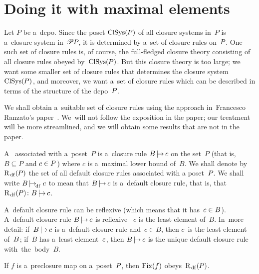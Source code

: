 \documentclass[11pt,letterpaper]{article}
\renewcommand{\thmskip}{\bigskip}
\begin{document}
\section{Doing it with maximal elements}
\label{sec:do-it-with-max-elems}

Let $P$ be a~dcpo.
Since the poset $\mathop{\smash{\mathrm{ClSys}}}\nolimits(\mspace{-1mu} P)$ of all closure systems in~$P$
	is a~closure system in $\mathscr{P}\mspace{-1mu} P\mspace{-1mu}$,
it is determined by a~set of closure rules on~$P\mspace{-1mu}$.
One such set of closure rules is, of course, the full-fledged closure theory
consisting of all closure rules obeyed by~$\mathop{\smash{\mathrm{ClSys}}}\nolimits(\mspace{-1mu} P)\mspace{1mu}$.
But this closure theory is too large;
we want some smaller set of closure rules
	that determines the closure system $\mathop{\smash{\mathrm{ClSys}}}\nolimits(\mspace{-1mu} P)\mspace{1mu}$,
and moreover,
we want a~set of closure rules
	which can be described in terms of the structure of the dcpo~$P\mspace{-1mu}$.

We shall obtain a~suitable set of closure rules using the approach
	in~Francesco Ranzato's paper~\cite{ranzato}.
We~will not follow the exposition in the paper;
our treatment will be more streamlined,	and we will obtain some results that are not in the paper.

\txtskip

A~ associated with a~poset~$P$ %
is a~closure rule $B\mspace{-2mu}\mathrel{{{|}\mspace{-3.5mu}{\rightarrow}}_{\!}}c$ on the set~$P$
	(that is, $B\subseteq P$ and $c\in P\mspace{1mu}$)
where $c$ is a~maximal lower bound of~$B$.
We shall denote by $\mathrm{R}_{\mspace{2mu}\mathrm{df}}(\mspace{-1mu} P)$
	the set of all default closure rules associated with a poset~$P\mspace{-1mu}$.
We shall write $B\mspace{-2mu}\mathrel{{{|}\mspace{-3.5mu}{\rightarrow}}_{\!\mathrm{df}}}c$
	to mean that $B\mspace{-2mu}\mathrel{{{|}\mspace{-3.5mu}{\rightarrow}}_{\!}}c$ is a~default closure rule,
that is, that $\mathrm{R}_{\mspace{2mu}\mathrm{df}}(\mspace{-1mu} P)\colon B\mspace{-2mu}\mathrel{{{|}\mspace{-3.5mu}{\rightarrow}}_{\!}}c\mspace{1mu}$.

\txtskip

A~default closure rule can be reflexive (which means that it has~$c\in B\mspace{1mu}$).
A~default closure rule $B\mspace{-2mu}\mathrel{{{|}\mspace{-3.5mu}{\rightarrow}}_{\!}}c$ is reflexive
\iff\ $c$ is the least element of~$B$.
In~more detail:
if~$B\mspace{-2mu}\mathrel{{{|}\mspace{-3.5mu}{\rightarrow}}_{\!}}c$ is a~default closure rule and~$c\in B$,
	then $c$~is the least element of~$B\mspace{1mu}$;
if~$B$ has a~least element~$c\mspace{1mu}$,
	then $B\mspace{-2mu}\mathrel{{{|}\mspace{-3.5mu}{\rightarrow}}_{\!}}c$ is the unique default closure rule with~the~body~$B$.

\thmskip

\begin{lemma}\label{lem:f-preclosure-on-P=>Fix(f)-obeys-Rdf(P)}
If\/ $f$ is a~preclosure map on a~poset\/~$P\mspace{-1mu}$,
	then\/ $\mathop{\smash{\mathrm{Fix}}}\nolimits(f)$ obeys\/~$\mathrm{R}_{\mspace{2mu}\mathrm{df}}(\mspace{-1mu} P)$.
\end{lemma}
\end{document}
